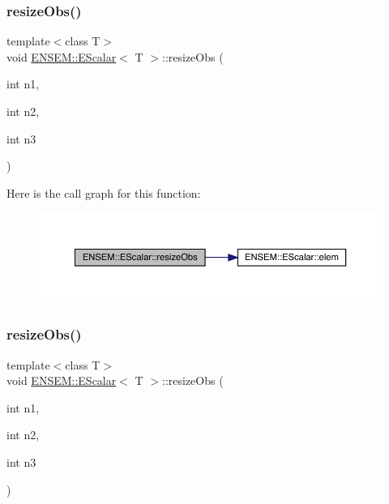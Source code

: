 \subsubsection{\texorpdfstring{resizeObs()}{resizeObs()}\hspace{0.1cm}{\footnotesize\ttfamily [8/12]}}
{\footnotesize\ttfamily template$<$class T$>$ \\
void \mbox{\hyperlink{classENSEM_1_1EScalar}{E\+N\+S\+E\+M\+::\+E\+Scalar}}$<$ T $>$\+::resize\+Obs (\begin{DoxyParamCaption}\item[{int}]{n1,  }\item[{int}]{n2,  }\item[{int}]{n3 }\end{DoxyParamCaption})\hspace{0.3cm}{\ttfamily [inline]}}

Here is the call graph for this function\+:
\nopagebreak
\begin{figure}[H]
\begin{center}
\leavevmode
\includegraphics[width=350pt]{d0/d82/classENSEM_1_1EScalar_a1849b1cf66ab1a983ca9e1f268afd109_cgraph}
\end{center}
\end{figure}
\mbox{\label{classENSEM_1_1EScalar_a1849b1cf66ab1a983ca9e1f268afd109}} 
\subsubsection{\texorpdfstring{resizeObs()}{resizeObs()}\hspace{0.1cm}{\footnotesize\ttfamily [9/12]}}
{\footnotesize\ttfamily template$<$class T$>$ \\
void \mbox{\hyperlink{classENSEM_1_1EScalar}{E\+N\+S\+E\+M\+::\+E\+Scalar}}$<$ T $>$\+::resize\+Obs (\begin{DoxyParamCaption}\item[{int}]{n1,  }\item[{int}]{n2,  }\item[{int}]{n3 }\end{DoxyParamCaption})\hspace{0.3cm}{\ttfamily [inline]}}

